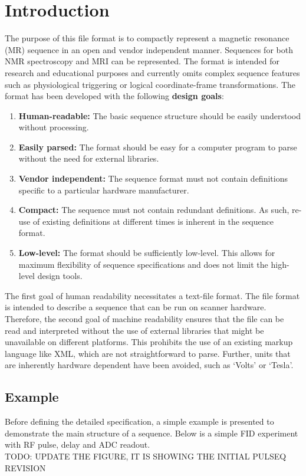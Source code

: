 \documentclass{article}
\begin{document}
\section{Introduction}
The purpose of this file format is to compactly represent a magnetic resonance (MR) sequence in an open and vendor independent manner. Sequences for both NMR spectroscopy and MRI can be represented. The format is intended for research and educational purposes and currently omits complex sequence features such as physiological triggering or logical coordinate-frame transformations. The format has been developed with the following \textbf{design goals}:
\begin{enumerate}
\item \textbf{Human-readable:} The basic sequence structure should be easily understood without processing.
\item \textbf{Easily parsed:} The format should be easy for a computer program to parse without the need for external libraries.
\item \textbf{Vendor independent:} The sequence format must not contain definitions specific to a particular hardware manufacturer.
\item \textbf{Compact:} The sequence must not contain redundant definitions. As such, re-use of existing definitions at different times is inherent in the sequence format.
\item \textbf{Low-level:} The format should be sufficiently low-level. This allows for maximum flexibility of sequence specifications and does not limit the high-level design tools.
\end{enumerate}

The first goal of human readability necessitates a text-file format. The file format is intended to describe a sequence that can be run on scanner hardware. Therefore, the second goal of machine readability ensures that the file can be read and interpreted without the use of external libraries that might be unavailable on different platforms. This prohibits the use of an existing markup language like XML, which are not straightforward to parse. Further, units  that are inherently hardware dependent have been avoided, such as `Volts' or `Tesla'. 


\subsection{Example}

Before defining the detailed specification, a simple example is presented to demonstrate the main structure of a sequence. Below is a simple FID experiment with RF pulse, delay and ADC readout. 
\\ TODO: UPDATE THE FIGURE, IT IS SHOWING THE INITIAL PULSEQ REVISION

\end{document}
